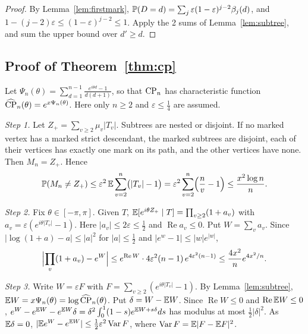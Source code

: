 \begin{proof}
By Lemma~\ref{lem:firstmark},
$\mathbb{P}(D=d)=\sum_j\varepsilon(1-\varepsilon)^{j-2}\beta_j(d)$, and
$1-(j-2)\varepsilon\le(1-\varepsilon)^{j-2}\le1$. Apply the 2 sums of
Lemma~\ref{lem:subtree}, and sum the upper bound over $d'\ge d$.
\end{proof}

\subsection{Proof of \texorpdfstring{Theorem~\ref{thm:cp}}{Theorem 3.7}}\label{app:shape-cp}

Let $\Psi_n(\theta)=\sum_{d=1}^{n-1}\frac{e^{i\theta d}-1}{d(d+1)}$, so that
$\mathrm{CP}_n$ has characteristic function $\widehat{\mathrm{CP}}_n(\theta)=e^{x\Psi_n(\theta)}$.
Here only $n\ge2$ and $\varepsilon\le\frac14$ are assumed.

\emph{Step 1.} Let $Z_+=\sum_{v\ge2}\mu_v\lvert T_v\rvert$. Subtrees are
nested or disjoint. If no marked vertex has a marked strict descendant, the
marked subtrees are disjoint, each of their vertices has exactly one mark
on its path, and the other vertices have none. Then $M_n=Z_+$. Hence
\[
 \mathbb{P}(M_n\ne Z_+)\le\varepsilon^2\,\mathbb{E}\sum_{v=2}^n\bigl(\lvert T_v\rvert-1\bigr)
 =\varepsilon^2\sum_{v=2}^n\Bigl(\frac nv-1\Bigr)\le\frac{x^2\log n}{n}.
\]

\emph{Step 2.} Fix $\theta\in[-\pi,\pi]$. Given $T$,
$\mathbb{E}[e^{i\theta Z_+}\mid T]=\prod_{v\ge2}(1+a_v)$ with
$a_v=\varepsilon(e^{i\theta\lvert T_v\rvert}-1)$. Here $\lvert a_v\rvert\le2\varepsilon\le\frac12$
and $\operatorname{Re}a_v\le0$. Put $W=\sum_va_v$. Since
$\lvert\log(1+a)-a\rvert\le\lvert a\rvert^2$ for $\lvert a\rvert\le\frac12$ and
$\lvert e^w-1\rvert\le\lvert w\rvert e^{\lvert w\rvert}$,
\[
 \Bigl\lvert\prod_v(1+a_v)-e^W\Bigr\rvert\le e^{\operatorname{Re}W}\cdot4\varepsilon^2(n-1)\,e^{4\varepsilon^2(n-1)}
 \le\frac{4x^2}ne^{4x^2/n}.
\]

\emph{Step 3.} Write $W=\varepsilon F$ with
$F=\sum_{v\ge2}(e^{i\theta\lvert T_v\rvert}-1)$. By Lemma~\ref{lem:subtree},
$\mathbb{E} W=x\Psi_n(\theta)=\log\widehat{\mathrm{CP}}_n(\theta)$. Put $\delta=W-\mathbb{E} W$.
Since $\operatorname{Re}W\le0$ and $\operatorname{Re}\mathbb{E} W\le0$,
$e^W-e^{\mathbb{E} W}-e^{\mathbb{E} W}\delta=\delta^2\int_0^1(1-s)e^{\mathbb{E} W+s\delta}ds$ has
modulus at most $\frac12\lvert\delta\rvert^2$. As $\mathbb{E}\delta=0$,
$\lvert\mathbb{E} e^W-e^{\mathbb{E} W}\rvert\le\frac12\varepsilon^2\operatorname{Var} F$, where
$\operatorname{Var} F=\mathbb{E}\lvert F-\mathbb{E} F\rvert^2$.

